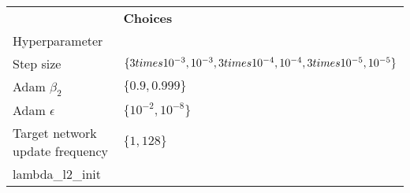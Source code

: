 \begin{tabular}{ll}
 & \bfseries Choices \\
Hyperparameter &  \\
Step size & $\{3 \\times 10^{-3}, 10^{-3}, 3 \\times 10^{-4}, 10^{-4}, 3 \\times 10^{-5}, 10^{-5}\}$ \\
Adam $\beta_2$ & $\{0.9, 0.999\}$ \\
Adam $\epsilon$ & $\{10^{-2}, 10^{-8}\}$ \\
Target network update frequency & $\{1, 128\}$ \\
lambda_l2_init &  \\
\end{tabular}
